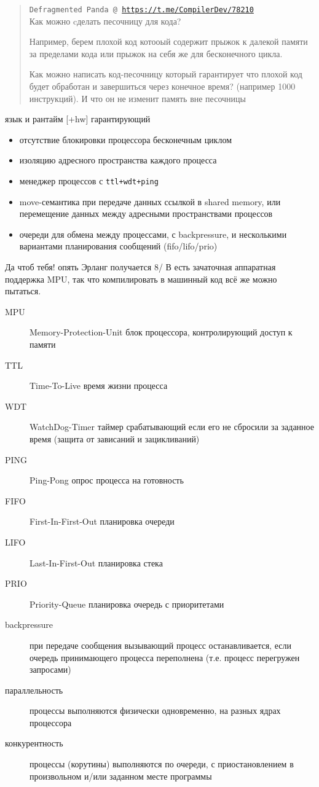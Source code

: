 \secdown

\begin{quotation}
\noindent
\texttt{Defragmented Panda @ \url{https://t.me/CompilerDev/78210}}\\

Как можно cделать песочницу для кода?

\smallskip
Например, берем плохой код котооый содержит прыжок к далекой памяти за пределами
кода или прыжок на себя же для бесконечного цикла.

\smallskip
Как можно написать код-песочницу который гарантирует что плохой код будет
обработан и завершиться через конечное время? (например 1000 инструкций).
И что он не изменит память вне песочницы
\end{quotation}

\clearpage\noindent
язык и рантайм [+hw] гарантирующий 
\begin{itemize}
\item 
отсутствие блокировки процессора бесконечным циклом
\item 
изоляцию адресного пространства каждого процесса
\item 
менеджер процессов с \verb|ttl+wdt+ping|
\item 
move-семантика при передаче данных ссылкой в shared memory, или перемещение
данных между адресными пространствами процессов
\item 
очереди для обмена между процессами, с backpressure, и несколькими вариантами
планирования сообщений (fifo/lifo/prio)
\end{itemize}

Да чтоб тебя! опять Эрланг получается 8/ В  есть зачаточная аппаратная
поддержка MPU, так что компилировать в машинный код всё же можно пытаться.

\begin{description}
    \item[MPU] Memory-Protection-Unit блок процессора, контролирующий доступ к
    памяти
    \item[TTL] Time-To-Live время жизни процесса
    \item[WDT] WatchDog-Timer таймер срабатывающий если его не сбросили за
    заданное время (защита от зависаний и зацикливаний)
    \item[PING] Ping-Pong опрос процесса на готовность
    \item[FIFO] First-In-First-Out планировка очереди
    \item[LIFO] Last-In-First-Out планировка стека
    \item[PRIO] Priority-Queue планировка очередь с приоритетами
    \item[backpressure] при передаче сообщения вызывающий процесс
    останавливается, если очередь принимающего процесса переполнена (т.е.
    процесс перегружен запросами)
    \item[параллельность] процессы выполняются физически одновременно, на разных
    ядрах процессора
    \item[конкурентность] процессы (корутины) выполняются по очереди, с
    приостановлением в произвольном и/или заданном месте программы
\end{description}



\secup
